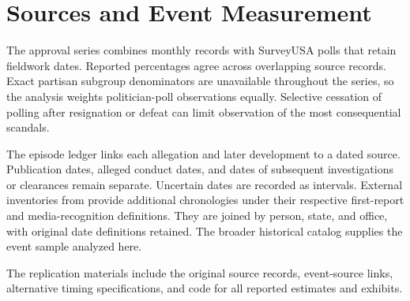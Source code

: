 \documentclass[11pt]{article}
\newcommand{\TableStyle}{\small\setlength{\tabcolsep}{5pt}\renewcommand{\arraystretch}{1.12}}
\begin{document}
\begin{table}[htbp]
\centering\TableStyle
\caption{Audience composition during the Olympics}
\label{tab:composition}
\caption*{Olympics coefficients from daily NBC-minus-mean-ABC/CBS composition comparisons. The final characteristic instead measures NBC's share of all three networks' respondents. Specifications, calendar HAC intervals, and equal-day weighting follow Table~\ref{tab:publicity}. Education runs from eighth grade or less to a postgraduate degree; it is an ordinal category, not years of schooling. College degree denotes a four-year degree or higher. All valid network viewers contribute, including independents. These comparisons describe audience changes rather than correcting selection into network viewing.}
\end{table}
\FloatBarrier

\section{Sources and Event Measurement}
\label{sec:limits}

The approval series combines monthly records with SurveyUSA polls that retain fieldwork dates. Reported percentages agree across overlapping source records. Exact partisan subgroup denominators are unavailable throughout the series, so the analysis weights politician-poll observations equally. Selective cessation of polling after resignation or defeat can limit observation of the most consequential scandals.

The episode ledger links each allegation and later development to a dated source. Publication dates, alleged conduct dates, and dates of subsequent investigations or clearances remain separate. Uncertain dates are recorded as intervals. External inventories from \citet{preuss2024,nyhan2017} provide additional chronologies under their respective first-report and media-recognition definitions. They are joined by person, state, and office, with original date definitions retained. The broader historical catalog supplies the event sample analyzed here.

The replication materials include the original source records, event-source links, alternative timing specifications, and code for all reported estimates and exhibits.
\end{document}
